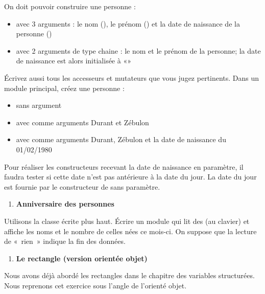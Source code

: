 {
On doit pouvoir construire une personne :}

\liststyleListi
\begin{itemize}
\item {
avec 3 arguments : le nom (), le prénom
() et la date de naissance de la personne
()}
\item {
avec 2 arguments de type chaine : le nom et le prénom de la personne; la
date de naissance est alors initialisée à «»}
\end{itemize}
{
Écrivez aussi tous les accesseurs et mutateurs que vous jugez
pertinents. Dans un module principal, créez une personne :}

\liststyleListi
\begin{itemize}
\item {
sans argument}
\item {
avec comme arguments {\textquotedbl}Durant{\textquotedbl} et
{\textquotedbl}Zébulon{\textquotedbl}}
\item {
avec comme arguments {\textquotedbl}Durant{\textquotedbl},
{\textquotedbl}Zébulon{\textquotedbl} et la date de naissance du
01/02/1980}
\end{itemize}
{
Pour réaliser les constructeurs recevant la date de naissance en
paramètre, il faudra tester si cette date n’est pas antérieure à la
date du jour. La date du jour est fournie par le constructeur de
 sans paramètre.}

\liststyleExercice
\begin{enumerate}
\item {\sffamily\bfseries
Anniversaire des personnes}
\end{enumerate}
{
Utilisons la classe  écrite plus haut.
Écrire un module qui lit des  (au clavier)
et affiche les noms et le nombre de celles nées ce mois-ci. On suppose
que la lecture de «~rien~» indique la fin des données.}

\liststyleExercice
\setcounter{saveenum}{\value{enumi}}
\begin{enumerate}
\setcounter{enumi}{\value{saveenum}}
\item {\sffamily\bfseries
Le rectangle (version orientée objet)}
\end{enumerate}
{
Nous avons déjà abordé les rectangles dans le chapitre des variables
structurées. Nous reprenons cet exercice sous l’angle de l’orienté
objet.}

